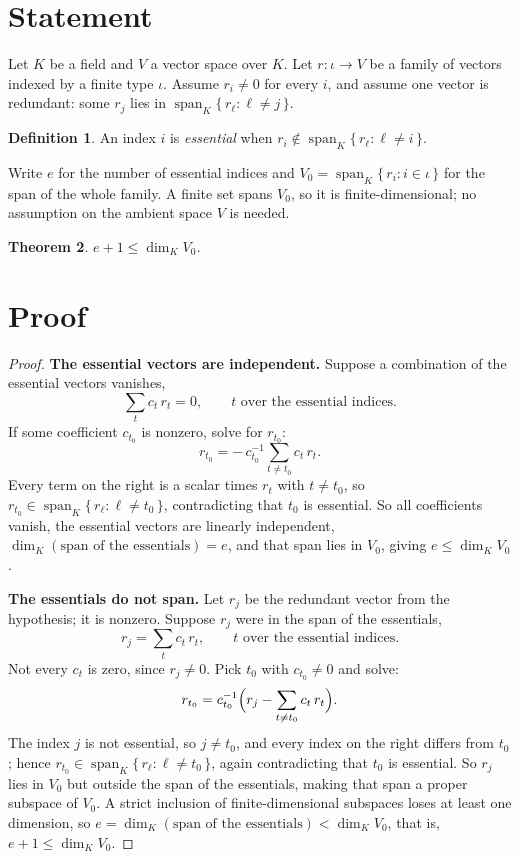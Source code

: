 \documentclass[11pt]{amsart}
\newtheorem{theorem}{Theorem}[section]
\theoremstyle{definition}
\newtheorem{definition}[theorem]{Definition}
\theoremstyle{remark}
\begin{document}
\section{Statement}\label{sec:statement}
Let $K$ be a field and $V$ a vector space over $K$. Let $r\colon\iota\to V$ be a family of
vectors indexed by a finite type $\iota$. Assume $r_i\neq 0$ for every $i$, and assume one
vector is redundant: some $r_j$ lies in $\operatorname{span}_K\{\,r_\ell:\ell\neq j\,\}$.

\begin{definition}\label{def:essential}
An index $i$ is \emph{essential} when $r_i\notin\operatorname{span}_K\{\,r_\ell:\ell\neq i\,\}$.
\end{definition}

Write $e$ for the number of essential indices and $V_0=\operatorname{span}_K\{\,r_i:i\in\iota\,\}$
for the span of the whole family. A finite set spans $V_0$, so it is finite-dimensional; no
assumption on the ambient space $V$ is needed.

\begin{theorem}\label{thm:main}
$e+1\le\dim_K V_0$.
\end{theorem}

\section{Proof}\label{sec:proof}
\begin{proof}
\textbf{The essential vectors are independent.} Suppose a combination of the essential vectors
vanishes,
\[ \sum_t c_t\, r_t = 0, \qquad t \text{ over the essential indices.} \]
If some coefficient $c_{t_0}$ is nonzero, solve for $r_{t_0}$:
\[ r_{t_0} = -\,c_{t_0}^{-1} \sum_{t\neq t_0} c_t\, r_t. \]
Every term on the right is a scalar times $r_t$ with $t\neq t_0$, so
$r_{t_0}\in\operatorname{span}_K\{\,r_\ell:\ell\neq t_0\,\}$, contradicting that $t_0$ is
essential. So all coefficients vanish, the essential vectors are linearly independent,
$\dim_K(\text{span of the essentials})=e$, and that span lies in $V_0$, giving $e\le\dim_K V_0$.

\smallskip
\textbf{The essentials do not span.} Let $r_j$ be the redundant vector from the hypothesis; it
is nonzero. Suppose $r_j$ were in the span of the essentials,
\[ r_j = \sum_t c_t\, r_t, \qquad t \text{ over the essential indices.} \]
Not every $c_t$ is zero, since $r_j\neq 0$. Pick $t_0$ with $c_{t_0}\neq 0$ and solve:
\[ r_{t_0} = c_{t_0}^{-1}\Bigl( r_j - \sum_{t\neq t_0} c_t\, r_t \Bigr). \]
The index $j$ is not essential, so $j\neq t_0$, and every index on the right differs from
$t_0$; hence $r_{t_0}\in\operatorname{span}_K\{\,r_\ell:\ell\neq t_0\,\}$, again contradicting
that $t_0$ is essential. So $r_j$ lies in $V_0$ but outside the span of the essentials, making
that span a proper subspace of $V_0$. A strict inclusion of finite-dimensional subspaces loses
at least one dimension, so $e=\dim_K(\text{span of the essentials})<\dim_K V_0$, that is,
$e+1\le\dim_K V_0$.
\end{proof}
\end{document}
